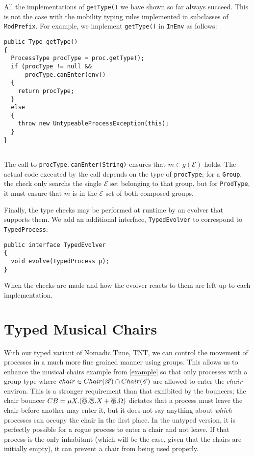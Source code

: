 All the implementations of \texttt{getType()} we have shown so far
always succeed.  This is not the case with the mobility typing rules
implemented in subclasses of \texttt{ModPrefix}.  For example, we
implement \texttt{getType()} in \texttt{InEnv} as follows:

\begin{verbatim}
public Type getType()
{
  ProcessType procType = proc.getType();  
  if (procType != null &&
      procType.canEnter(env))
  {
    return procType;
  }
  else
  {
    throw new UntypeableProcessException(this);
  }
}
 
\end{verbatim}

\noindent The call to \texttt{procType.canEnter(String)} ensures that
$m \in g(\mathscr{E})$ holds.  The actual code executed by the call
depends on the type of \texttt{procType}; for a \texttt{Group}, the
check only searchs the single $\mathcal{E}$ set belonging to that
group, but for \texttt{ProdType}, it must ensure that $m$ is in the
$\mathcal{E}$ set of both composed groups.

Finally, the type checks may be performed at runtime by an evolver
that supports them.  We add an additional interface,
\texttt{TypedEvolver} to correspond to \texttt{TypedProcess}:

\begin{verbatim}
public interface TypedEvolver
{
  void evolve(TypedProcess p);
}
\end{verbatim}

\noindent When the checks are made and how the evolver reacts to them
are left up to each implementation.

\section{Typed Musical Chairs}

With our typed variant of Nomadic Time, TNT, we can control the
movement of processes in a much more fine grained manner using groups.
This allows us to enhance the musical chairs example from
\ref{example} so that only processes with a group type where $chair
\in Chair(\mathscr{R}) \cap Chair(\mathscr{E})$ are allowed to enter the
$chair$ environ.  This is a stronger requirement than that exhibited
by the bouncers; the chair bouncer $CB = \mu X.(\overline{\varovee} .\overline{\varowedge} .X +
\overline{\varoast} .\Omega)$ dictates that a process must leave the chair before
another may enter it, but it does not say anything about \emph{which}
processes can occupy the chair in the first place.  In the untyped
version, it is perfectly possible for a rogue process to enter a chair
and not leave.  If that process is the only inhabitant (which will be
the case, given that the chairs are initially empty), it can prevent a
chair from being used properly.

